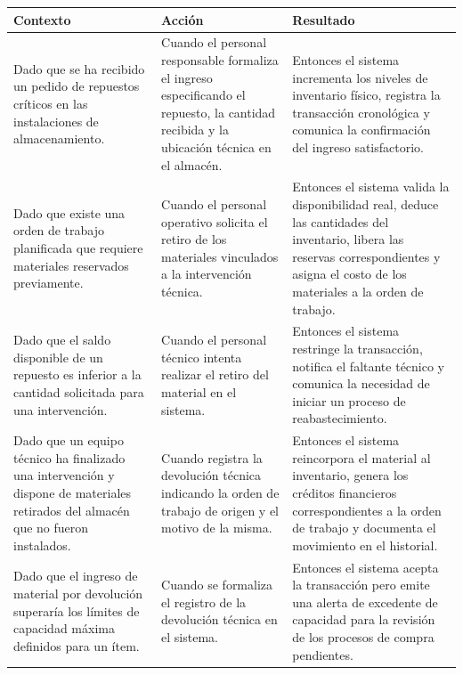 \footnotesize\begin{longtable}{|p{0.28\textwidth}|p{0.32\textwidth}|p{0.34\textwidth}|}\hline
\textbf{Contexto} & \textbf{Acción} & \textbf{Resultado} \\ \hline
\parbox[t]{\linewidth}{Dado que se ha recibido un pedido de repuestos críticos en las instalaciones de almacenamiento.} & \parbox[t]{\linewidth}{Cuando el personal responsable formaliza el ingreso especificando el repuesto, la cantidad recibida y la ubicación técnica en el almacén.} & \parbox[t]{\linewidth}{Entonces el sistema incrementa los niveles de inventario físico, registra la transacción cronológica y comunica la confirmación del ingreso satisfactorio.} \\ \hline
\parbox[t]{\linewidth}{Dado que existe una orden de trabajo planificada que requiere materiales reservados previamente.} & \parbox[t]{\linewidth}{Cuando el personal operativo solicita el retiro de los materiales vinculados a la intervención técnica.} & \parbox[t]{\linewidth}{Entonces el sistema valida la disponibilidad real, deduce las cantidades del inventario, libera las reservas correspondientes y asigna el costo de los materiales a la orden de trabajo.} \\ \hline
\parbox[t]{\linewidth}{Dado que el saldo disponible de un repuesto es inferior a la cantidad solicitada para una intervención.} & \parbox[t]{\linewidth}{Cuando el personal técnico intenta realizar el retiro del material en el sistema.} & \parbox[t]{\linewidth}{Entonces el sistema restringe la transacción, notifica el faltante técnico y comunica la necesidad de iniciar un proceso de reabastecimiento.} \\ \hline
\parbox[t]{\linewidth}{Dado que un equipo técnico ha finalizado una intervención y dispone de materiales retirados del almacén que no fueron instalados.} & \parbox[t]{\linewidth}{Cuando registra la devolución técnica indicando la orden de trabajo de origen y el motivo de la misma.} & \parbox[t]{\linewidth}{Entonces el sistema reincorpora el material al inventario, genera los créditos financieros correspondientes a la orden de trabajo y documenta el movimiento en el historial.} \\ \hline
\parbox[t]{\linewidth}{Dado que el ingreso de material por devolución superaría los límites de capacidad máxima definidos para un ítem.} & \parbox[t]{\linewidth}{Cuando se formaliza el registro de la devolución técnica en el sistema.} & \parbox[t]{\linewidth}{Entonces el sistema acepta la transacción pero emite una alerta de excedente de capacidad para la revisión de los procesos de compra pendientes.} \\ \hline
\end{longtable}\normalsize
